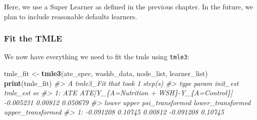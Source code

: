 \documentclass[12pt, krantz2,]{krantz}
\newenvironment{Shaded}{\begin{snugshade}}{\end{snugshade}}
\newcommand{\CommentTok}[1]{\textcolor[rgb]{0.37,0.37,0.37}{\textit{#1}}}
\newcommand{\DataTypeTok}[1]{\textcolor[rgb]{0.27,0.27,0.27}{#1}}
\newcommand{\KeywordTok}[1]{\textcolor[rgb]{0.27,0.27,0.27}{\textbf{#1}}}
\newcommand{\NormalTok}[1]{#1}
\newcommand{\OperatorTok}[1]{\textcolor[rgb]{0.43,0.43,0.43}{\textbf{#1}}}
\newcommand{\StringTok}[1]{\textcolor[rgb]{0.5,0.5,0.5}{#1}}
\theoremstyle{definition}
\theoremstyle{definition}
\theoremstyle{definition}
\newcommand{\1}{\mathbbm{1}}
\begin{document}
\begin{Shaded}
\end{Shaded}

Here, we use a Super Learner as defined in the previous chapter. In the future,
we plan to include reasonable defaults learners.

\hypertarget{fit-the-tmle}{%
\subsubsection{Fit the TMLE}\label{fit-the-tmle}}

We now have everything we need to fit the tmle using \texttt{tmle3}:

\begin{Shaded}
\begin{Highlighting}[]
\NormalTok{tmle_fit <-}\StringTok{ }\KeywordTok{tmle3}\NormalTok{(ate_spec, washb_data, node_list, learner_list)}
\KeywordTok{print}\NormalTok{(tmle_fit)}
\CommentTok{#> A tmle3_Fit that took 1 step(s)}
\CommentTok{#>    type                                    param  init_est tmle_est       se}
\CommentTok{#> 1:  ATE ATE[Y_\{A=Nutrition + WSH\}-Y_\{A=Control\}] -0.005231  0.00812 0.050679}
\CommentTok{#>        lower   upper psi_transformed lower_transformed upper_transformed}
\CommentTok{#> 1: -0.091208 0.10745         0.00812         -0.091208           0.10745}
\end{Highlighting}
\end{Shaded}
\end{document}
